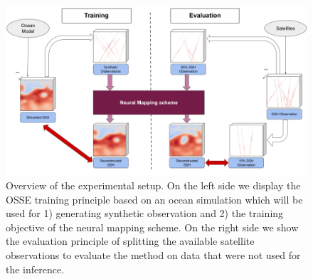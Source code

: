 
\begin{figure}[H]
    \centering
    \includegraphics[width=\textwidth]{figures/schema_method.png}
    \caption{Overview of the experimental setup. On the left side we display the OSSE training principle based on an ocean simulation which will be used for 1) generating synthetic observation and 2) the training objective of the neural mapping scheme. On the right side we show the evaluation principle of splitting the available satellite observations to evaluate the method on data that were not used for the inference.}
    \label{fig:method}
\end{figure}